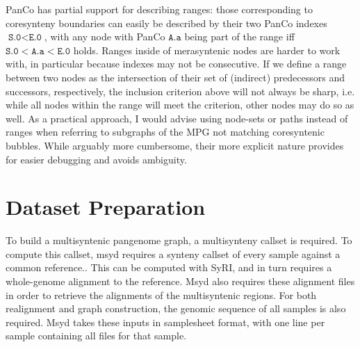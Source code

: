 PanCo has partial support for describing ranges: those corresponding to coresynteny boundaries can easily be described by their two PanCo indexes $\texttt{S.0} < \texttt{E.0}$, with any node with PanCo $\texttt{A.a}$ being part of the range iff $\texttt{S.0} < \texttt{A.a} < \texttt{E.0}$ holds.
Ranges inside of merasyntenic nodes are harder to work with, in particular because indexes may not be consecutive.
If we define a range between two nodes as the intersection of their set of (indirect) predecessors and successors, respectively, the inclusion criterion above will not always be sharp, i.e. while all nodes within the range will meet the criterion, other nodes may do so as well.
As a practical approach, I would advise using node-sets or paths instead of ranges when referring to subgraphs of the MPG not matching coresyntenic bubbles.
While arguably more cumbersome, their more explicit nature provides for easier debugging and avoids ambiguity. %



\newpage
\section*{Dataset Preparation}

To build a multisyntenic pangenome graph, a multisynteny callset is required.
To compute this callset, msyd requires a synteny callset of every sample against a common reference..
This can be computed with SyRI, and in turn requires a whole-genome alignment to the reference.
Msyd also requires these alignment files in order to retrieve the alignments of the multisyntenic regions.
For both realignment and graph construction, the genomic sequence of all samples is also required.
Msyd takes these inputs in samplesheet format, with one line per sample containing all files for that sample.

